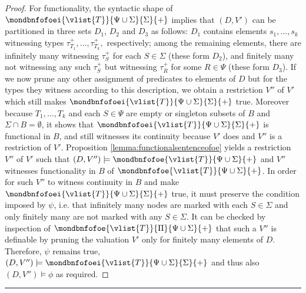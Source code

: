 \begin{proof}
For functionality, the syntactic shape of
$\mondbnfofoei{\vlist{T}}{\Psi \cup \Sigma}{ \Sigma}{+}$ implies that
$(D,V')$ can be partitioned in three sets $D_1$, $D_2$ and $D_3$ as
follows: $D_1$ contains elements $s_1, \dots, s_k$ witnessing types
$\tau^+_{T_1},\dots, \tau^+_{T_k},$ respectively; among the remaining
elements, there are infinitely many witnessing $\tau^+_S$ for each
$S\in \Sigma$ (these form $D_2$), and finitely many not witnessing
any such $\tau^+_S$ but witnessing $\tau^+_R$ for some $R \in \Psi$
(these form $D_3$). If we now prune any other assignment of
predicates to elements of $D$ but for the types they witness
according to this description, we obtain a restriction $V''$ of $V'$
which still makes $\mondbnfofoei{\vlist{T}}{\Psi \cup \Sigma}{
\Sigma}{+}$ true. Moreover because $T_1,\dots,T_k$ and each $S \in
\Psi$ are empty or singleton subsets of $B$ and $\Sigma \cap B =
\emptyset$, it shows that $\mondbnfofoei{\vlist{T}}{\Psi \cup
\Sigma}{ \Sigma}{+}$ is functional in $B$, and still witnesses its
continuity because $V'$ does and $V''$ is a restriction of $V'$.
Proposition \ref{lemma:functionalsentenceofoe} yields a restriction
$V''$ of $V'$ such that $(D,V'') \models \mondbnfofoe{\vlist{T}}{\Psi
\cup \Sigma}{+}$ and $V''$ witnesses functionality in $B$ of
$\mondbnfofoe{\vlist{T}}{\Psi \cup \Sigma}{+}$. In order for such
$V''$ to witness continuity in $B$ and make
$\mondbnfofoei{\vlist{T}}{\Psi \cup \Sigma}{\Sigma}{+}$ true, it must
preserve the condition imposed by $\psi$, i.e. that infinitely many
nodes are marked with each $S \in \Sigma$ and only finitely many are
not marked with any $S \in \Sigma$. It can be checked by inspection
of $\mondbnfofoe{\vlist{T}}{\Pi}{\Psi \cup \Sigma}{+}$ that such a
$V''$ is definable by pruning the valuation $V'$ only for finitely
many elements of $D$. Therefore, $\psi$ remains true, $(D,V'')\models
\mondbnfofoei{\vlist{T}}{\Psi \cup \Sigma}{ \Sigma}{+}$ and thus also
$(D,V'') \models \phi$ as required. 
\end{proof}

\bigskip \hrule \bigskip

